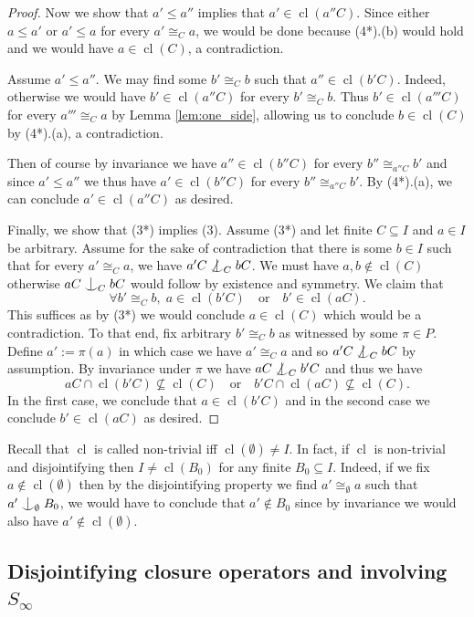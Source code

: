 \documentclass[12pt]{amsart}
\theoremstyle{plain}
\theoremstyle{definition}
\newcommand{\isom}{\cong}
\DeclareMathOperator{\cl}{cl}
\newcommand{\forkindep}[1][]{%
  \mathrel{
    \mathop{
      \vcenter{
        \hbox{\oalign{\noalign{\kern-.3ex}\hfil$\vert$\hfil\cr
              \noalign{\kern-.7ex}
              $\smile$\cr\noalign{\kern-.3ex}}}
      }
    }\displaylimits_{#1}
  }
}
\begin{document}
\begin{proof}
Now we show that $a' \le a''$ implies that $a' \in \cl(a''C)$.
Since either $a \le a'$ or $a' \le a$ for every $a' \isom_C a$, we would be done because (4*).(b) would hold and we would have $a \in \cl(C)$, a contradiction.

Assume $a' \le a''$.
We may find some $b' \isom_C b$ such that $a'' \in \cl(b'C)$.
Indeed, otherwise we would have $b' \in \cl(a''C)$ for every $b' \isom_C b$.
Thus $b' \in \cl(a'''C)$ for every $a''' \isom_C a$ by Lemma \ref{lem:one_side}, allowing us to conclude $b \in \cl(C)$ by (4*).(a), a contradiction.

Then of course by invariance we have $a'' \in \cl(b''C)$ for every $b'' \isom_{a''C} b'$ and since $a' \le a''$ we thus have $a' \in \cl(b''C)$ for every $b'' \isom_{a''C} b'$.
By (4*).(a), we can conclude $a' \in \cl(a''C)$ as desired.

Finally, we show that (3*) implies (3).
Assume (3*) and let finite $C \subseteq I$ and $a \in I$ be arbitrary.
Assume for the sake of contradiction that there is some $b \in I$ such that for every $a' \isom_C a$, we have $a'C \not\forkindep[C] bC$.
We must have $a, b \not\in \cl(C)$ otherwise $aC \forkindep[C] bC$ would follow by existence and symmetry.
We claim that
\[ \forall b' \isom_C b, \; a \in \cl(b'C) \quad \text{or} \quad b' \in \cl(aC). \]
This suffices as by (3*) we would conclude $a \in \cl(C)$ which would be a contradiction.
To that end, fix arbitrary $b' \isom_C b$ as witnessed by some $\pi \in P$.
Define $a' := \pi(a)$ in which case we have $a' \isom_C a$ and so $a'C \not\forkindep[C] bC$ by assumption.
By invariance under $\pi$ we have $aC \not\forkindep[C] b'C$ and thus we have
\[ aC \cap \cl(b'C) \not\subseteq \cl(C) \quad \text{or} \quad b'C \cap \cl(aC) \not\subseteq \cl(C). \]
In the first case, we conclude that $a \in \cl(b'C)$ and in the second case we conclude $b' \in \cl(aC)$ as desired.
\end{proof}

Recall that $\cl$ is called non-trivial iff $\cl(\emptyset) \neq I$.
In fact, if $\cl$ is non-trivial and disjointifying then $I \neq \cl(B_0)$ for any finite $B_0 \subseteq I$.
Indeed, if we fix $a \not\in \cl(\emptyset)$ then by the disjointifying property we find $a' \isom_\emptyset a$ such that $a' \forkindep[\emptyset] B_0$, we would have to conclude that $a' \not\in B_0$ since by invariance we would also have $a' \not\in \cl(\emptyset)$.

\subsection{Disjointifying closure operators and involving $S_\infty$}
\end{document}
